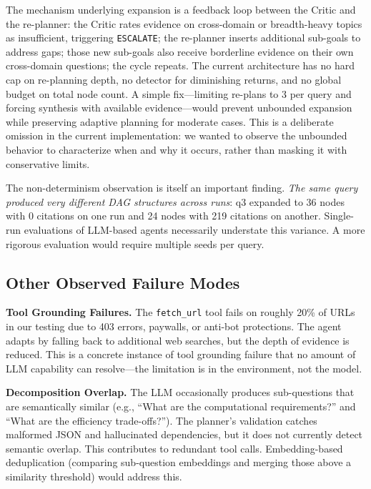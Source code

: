 \documentclass[11pt]{article}
\begin{document}
The mechanism underlying expansion is a feedback loop between the Critic and the re-planner: the Critic rates evidence on cross-domain or breadth-heavy topics as insufficient, triggering \texttt{ESCALATE}; the re-planner inserts additional sub-goals to address gaps; those new sub-goals also receive borderline evidence on their own cross-domain questions; the cycle repeats. The current architecture has no hard cap on re-planning depth, no detector for diminishing returns, and no global budget on total node count. A simple fix---limiting re-plans to 3 per query and forcing synthesis with available evidence---would prevent unbounded expansion while preserving adaptive planning for moderate cases. This is a deliberate omission in the current implementation: we wanted to observe the unbounded behavior to characterize when and why it occurs, rather than masking it with conservative limits.

The non-determinism observation is itself an important finding. \emph{The same query produced very different DAG structures across runs}: q3 expanded to 36 nodes with 0 citations on one run and 24 nodes with 219 citations on another. Single-run evaluations of LLM-based agents necessarily understate this variance. A more rigorous evaluation would require multiple seeds per query.

\subsection{Other Observed Failure Modes}

\textbf{Tool Grounding Failures.} The \texttt{fetch\_url} tool fails on roughly 20\% of URLs in our testing due to 403 errors, paywalls, or anti-bot protections. The agent adapts by falling back to additional web searches, but the depth of evidence is reduced. This is a concrete instance of tool grounding failure that no amount of LLM capability can resolve---the limitation is in the environment, not the model.

\textbf{Decomposition Overlap.} The LLM occasionally produces sub-questions that are semantically similar (e.g., ``What are the computational requirements?'' and ``What are the efficiency trade-offs?''). The planner's validation catches malformed JSON and hallucinated dependencies, but it does not currently detect semantic overlap. This contributes to redundant tool calls. Embedding-based deduplication (comparing sub-question embeddings and merging those above a similarity threshold) would address this.
\end{document}
